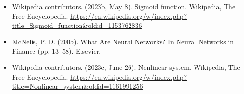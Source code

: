 \documentclass[12pt]{book}
\begin{document}
\begin{itemize}
\item Wikipedia contributors. (2023b, May 8). Sigmoid function. Wikipedia, The Free Encyclopedia.
  \url{https://en.wikipedia.org/w/index.php?title=Sigmoid_function&oldid=1153762836}
\item McNelis, P. D. (2005). What Are Neural Networks? In Neural Networks in Finance (pp. 13–58). Elsevier.
\item  Wikipedia contributors. (2023c, June 26). Nonlinear system. Wikipedia, The Free Encyclopedia.
  \url{https://en.wikipedia.org/w/index.php?title=Nonlinear_system&oldid=1161991256}



\end{itemize}
\end{document}
